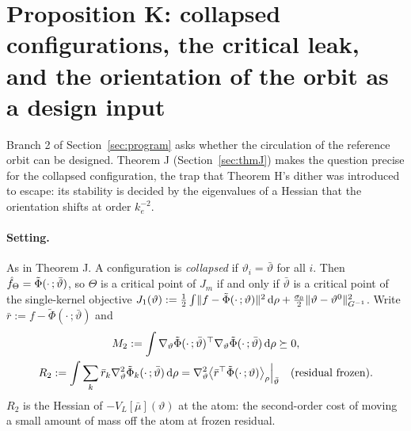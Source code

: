 \section{Proposition K: collapsed configurations, the critical leak, and the orientation of the orbit as a design input}\label{sec:thmK}

Branch 2 of Section~\ref{sec:program} asks whether the circulation of the reference orbit can be designed. Theorem J
(Section~\ref{sec:thmJ}) makes the question precise for the collapsed configuration, the trap that Theorem H's dither
was introduced to escape: its stability is decided by the eigenvalues of a Hessian that the orientation shifts at
order $k_e^{-2}$.

\paragraph{Setting.} As in Theorem J. A configuration is \emph{collapsed} if $\vartheta_i = \bar\vartheta$ for all
$i$. Then $\hat f_\Theta = \tilde\Phi(\cdot\,;\bar\vartheta)$, so $\Theta$ is a critical point of $J_m$ if and only if
$\bar\vartheta$ is a critical point of the single-kernel objective
$J_1(\vartheta) := \frac12\int\lVert f - \tilde\Phi(\cdot\,;\vartheta)\rVert^2\,\mathrm{d}\rho
+ \frac{\sigma_0}{2}\lVert \vartheta - \vartheta^0\rVert^2_{G^{-1}}$. Write $\bar r := f - \tilde\Phi(\cdot\,;\bar\vartheta)$
and
\begin{gather*}
  M_2 := \int\nabla_\vartheta\tilde\Phi(\cdot\,;\bar\vartheta)^\top\nabla_\vartheta\tilde\Phi(\cdot\,;\bar\vartheta)\,\mathrm{d}\rho\succeq0,\\
  R_2 := \int\sum_k\bar r_k\nabla^2_\vartheta\tilde\Phi_k(\cdot\,;\bar\vartheta)\,\mathrm{d}\rho
  = \nabla^2_\vartheta\bigl\langle\bar r^\top\tilde\Phi(\cdot\,;\vartheta)\bigr\rangle_\rho\Big|_{\bar\vartheta}
  \quad\text{(residual frozen)}.
\end{gather*}
$R_2$ is the Hessian of $-V_L[\bar\mu](\vartheta)$ at the atom: the second-order cost of moving a small amount of mass
off the atom at frozen residual.

